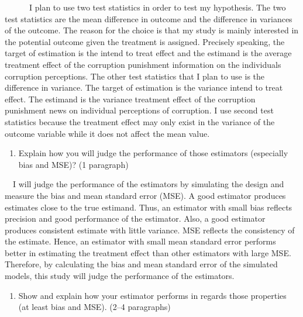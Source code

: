 \documentclass[
  11pt,
]{article}
\providecommand{\tightlist}{%
  \setlength{\itemsep}{0pt}\setlength{\parskip}{0pt}}
\begin{document}
~~~~~~I plan to use two test statistics in order to test my hypothesis.
The two test statistics are the mean difference in outcome and the
difference in variances of the outcome. The reason for the choice is
that my study is mainly interested in the potential outcome given the
treatment is assigned. Precisely speaking, the target of estimation is
the intend to treat effect and the estimand is the average treatment
effect of the corruption punishment information on the individuals
corruption perceptions. The other test statistics that I plan to use is
the difference in variance. The target of estimation is the variance
intend to treat effect. The estimand is the variance treatment effect of
the corruption punishment news on individual perceptions of corruption.
I use second test statistics because the treatment effect may only exist
in the variance of the outcome variable while it does not affect the
mean value.

\begin{enumerate}
\def\labelenumi{\arabic{enumi}.}
\setcounter{enumi}{11}
\tightlist
\item
  Explain how you will judge the performance of those estimators
  (especially bias and MSE)? (1 paragraph)
\end{enumerate}

~~I will judge the performance of the estimators by simulating the
design and measure the bias and mean standard error (MSE). A good
estimator produces estimates close to the true estimand. Thus, an
estimator with small bias reflects precision and good performance of the
estimator. Also, a good estimator produces consistent estimate with
little variance. MSE reflects the consistency of the estimate. Hence, an
estimator with small mean standard error performs better in estimating
the treatment effect than other estimators with large MSE. Therefore, by
calculating the bias and mean standard error of the simulated models,
this study will judge the performance of the estimators.

\begin{enumerate}
\def\labelenumi{\arabic{enumi}.}
\setcounter{enumi}{12}
\tightlist
\item
  Show and explain how your estimator performs in regards those
  properties (at least bias and MSE). (2--4 paragraphs)
\end{enumerate}
\end{document}
